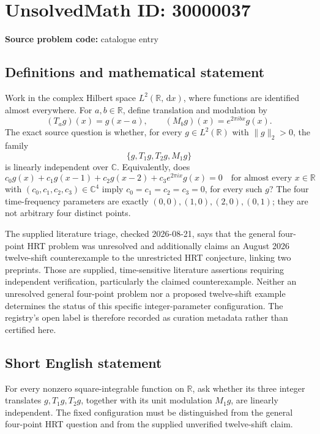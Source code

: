 \documentclass[11pt]{article}
\newcommand{\R}{\mathbb{R}}
\newcommand{\C}{\mathbb{C}}
\newcommand{\dd}{\,\mathrm{d}}
\begin{document}
\section*{UnsolvedMath ID: 30000037}
\textbf{Source problem code:} catalogue entry
\subsection{Definitions and mathematical statement}
Work in the complex Hilbert space \(L^2(\R,\dd x)\), where functions are identified almost everywhere. For \(a,b\in\R\), define translation and modulation by
\[
(T_ag)(x)=g(x-a),\qquad (M_bg)(x)=e^{2\pi i b x}g(x).
\]
The exact source question is whether, for every \(g\in L^2(\R)\) with \(\|g\|_2>0\), the family
\[
\{g,T_1g,T_2g,M_1g\}
\]
is linearly independent over \(\C\). Equivalently, does
\[
c_0g(x)+c_1g(x-1)+c_2g(x-2)+c_3e^{2\pi i x}g(x)=0
\quad\text{for almost every }x\in\R
\]
with \((c_0,c_1,c_2,c_3)\in\C^4\) imply \(c_0=c_1=c_2=c_3=0\), for every such \(g\)? The four time-frequency parameters are exactly \((0,0),(1,0),(2,0),(0,1)\); they are not arbitrary four distinct points.

The supplied literature triage, checked 2026-08-21, says that the general four-point HRT problem was unresolved and additionally claims an August 2026 twelve-shift counterexample to the unrestricted HRT conjecture, linking two preprints. Those are supplied, time-sensitive literature assertions requiring independent verification, particularly the claimed counterexample. Neither an unresolved general four-point problem nor a proposed twelve-shift example determines the status of this specific integer-parameter configuration. The registry's open label is therefore recorded as curation metadata rather than certified here.
\subsection{Short English statement}
For every nonzero square-integrable function on \(\R\), ask whether its three integer translates \(g,T_1g,T_2g\), together with its unit modulation \(M_1g\), are linearly independent. The fixed configuration must be distinguished from the general four-point HRT question and from the supplied unverified twelve-shift claim.
\end{document}

